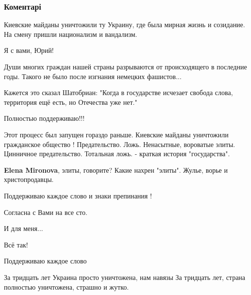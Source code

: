  
 
 
 
 
\subsubsection{Коментарі}

\begin{itemize} %
Киевские майданы уничтожили ту Украину, где была мирная жизнь и созидание. На смену пришли национализм и вандализм.

Я с вами, Юрий!

Души многих граждан нашей страны разрываются от происходящего в последние годы. Такого не было после изгнания немецких фашистов...

Кажется это сказал Шатобриан: "Когда в государстве исчезает свобода слова, территория ещё есть, но Отечества уже нет."

Полностью поддерживаю!!!


Этот процесс был запущен гораздо раньше. Киевские майданы уничтожили
гражданское общество ! Предательство. Ложь. Ненасытные, вороватые элиты.
Цинничное предательство. Тотальная ложь. - краткая история "государства".

\begin{itemize} %
\textbf{Elena Mironova}, элиты, говорите? Какие нахрен "элиты". Жулье, ворье и христопродавцы.
\end{itemize} %

Поддерживаю каждое слово и знаки препинания !

Согласна с Вами на все сто.

И для меня...

Всё так!

Поддерживаю каждое слово

За тридцать лет Украина просто уничтожена, нам навязы
За тридцать лет, страна полностью уничтожена, страшно и жутко.


\end{itemize}
